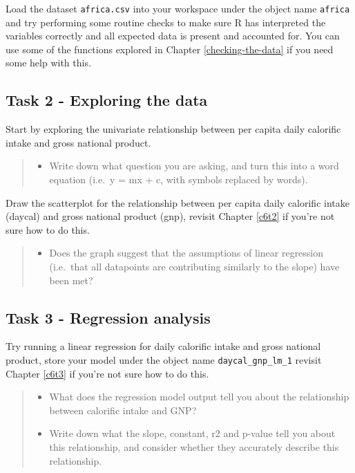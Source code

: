 \documentclass[
]{book}
\providecommand{\tightlist}{%
  \setlength{\itemsep}{0pt}\setlength{\parskip}{0pt}}
\begin{document}
Load the dataset \texttt{africa.csv} into your workspace under the object name \texttt{africa} and try performing some routine checks to make sure R has interpreted the variables correctly and all expected data is present and accounted for. You can use some of the functions explored in Chapter \ref{checking-the-data} if you need some help with this.

\hypertarget{task-2---exploring-the-data}{%
\subsection{Task 2 - Exploring the data}\label{task-2---exploring-the-data}}

Start by exploring the univariate relationship between per capita daily calorific intake and gross national product.

\begin{quote}
\begin{itemize}
\tightlist
\item
  Write down what question you are asking, and turn this into a word equation (i.e.~y = mx + c, with symbols replaced by words).
\end{itemize}
\end{quote}

Draw the scatterplot for the relationship between per capita daily calorific intake (daycal) and gross national product (gnp), revisit Chapter \ref{c6t2} if you're not sure how to do this.

\begin{quote}
\begin{itemize}
\tightlist
\item
  Does the graph suggest that the assumptions of linear regression (i.e.~that all datapoints are contributing similarly to the slope) have been met?
\end{itemize}
\end{quote}

\hypertarget{task-3---regression-analysis}{%
\subsection{Task 3 - Regression analysis}\label{task-3---regression-analysis}}

Try running a linear regression for daily calorific intake and gross national product, store your model under the object name \texttt{daycal\_gnp\_lm\_1} revisit Chapter \ref{c6t3} if you're not sure how to do this.

\begin{quote}
\begin{itemize}
\tightlist
\item
  What does the regression model output tell you about the relationship between calorific intake and GNP?
\item
  Write down what the slope, constant, r2 and p-value tell you about this relationship, and consider whether they accurately describe this relationship.
\end{itemize}
\end{quote}
\end{document}
